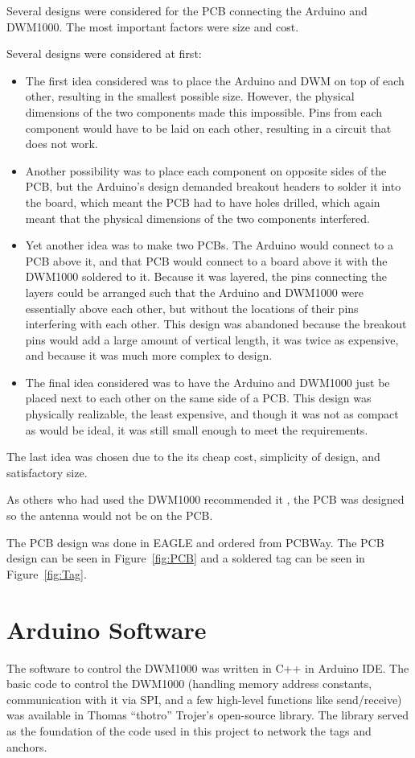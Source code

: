 Several designs were considered for the PCB connecting the Arduino and DWM1000. The most important factors were size and cost.

Several designs were considered at first:
\begin{itemize}
	\item The first idea considered was to place the Arduino and DWM on top of each other, resulting in the smallest possible size. However, the physical dimensions of the two components made this impossible. Pins from each component would have to be laid on each other, resulting in a circuit that does not work.
	\item Another possibility was to place each component on opposite sides of the PCB, but the Arduino's design demanded breakout headers to solder it into the board, which meant the PCB had to have holes drilled, which again meant that the physical dimensions of the two components interfered.
	\item Yet another idea was to make two PCBs. The Arduino would connect to a PCB above it, and that PCB would connect to a board above it with the DWM1000 soldered to it. Because it was layered, the pins connecting the layers could be arranged such that the Arduino and DWM1000 were essentially above each other, but without the locations of their pins interfering with each other. This design was abandoned because the breakout pins would add a large amount of vertical length, it was twice as expensive, and because it was much more complex to design.
	\item The final idea considered was to have the Arduino and DWM1000 just be placed next to each other on the same side of a PCB. This design was physically realizable, the least expensive, and though it was not as compact as would be ideal, it was still small enough to meet the requirements.
\end{itemize}

The last idea was chosen due to the its cheap cost, simplicity of design, and satisfactory size. 

As others who had used the DWM1000 recommended it \cite{LPSMini}, the PCB was designed so the antenna would not be on the PCB.

The PCB design was done in EAGLE and ordered from PCBWay. The PCB design can be seen in Figure~\ref{fig:PCB} and a soldered tag can be seen in Figure~\ref{fig:Tag}.

\section{Arduino Software}
The software to control the DWM1000 was written in C++ in Arduino IDE. The basic code to control the DWM1000 (handling memory address constants, communication with it via SPI, and a few high-level functions like send/receive) was available in Thomas ``thotro'' Trojer's open-source  library. The library served as the foundation of the code used in this project to network the tags and anchors.

